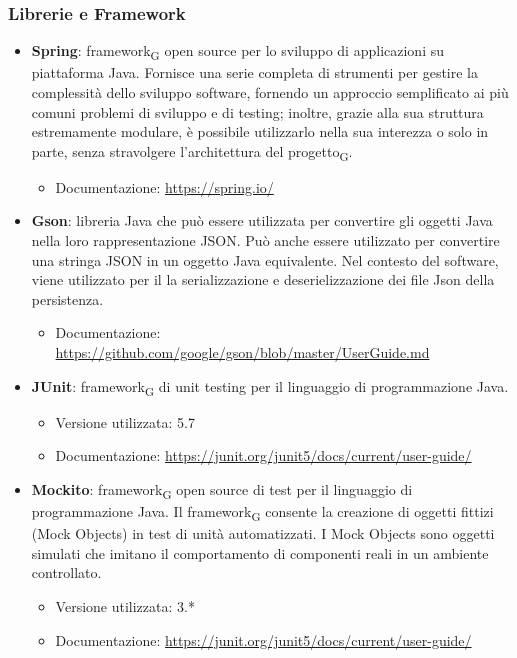 \subsubsection{Librerie e Framework}

\begin{itemize}
	\item \textbf{Spring}: framework\textsubscript{G} open source per lo sviluppo di applicazioni su piattaforma Java. Fornisce una serie completa di strumenti per gestire la complessità dello sviluppo software, fornendo un approccio semplificato ai più comuni problemi di sviluppo e di testing; inoltre, grazie alla sua struttura estremamente modulare, è possibile utilizzarlo nella sua interezza o solo in parte, senza stravolgere l’architettura del progetto\textsubscript{G}.
	\begin{itemize}
		\item Documentazione: \url{https://spring.io/}
	\end{itemize}
	\item \textbf{Gson}: libreria Java che può essere utilizzata per convertire gli oggetti Java nella loro rappresentazione JSON. Può anche essere utilizzato per convertire una stringa JSON in un oggetto Java equivalente. Nel contesto del software, viene utilizzato per il la serializzazione e deserielizzazione dei file Json della persistenza.
	\begin{itemize}
	\item Documentazione: \url{https://github.com/google/gson/blob/master/UserGuide.md}
	\end{itemize}
	\item \textbf{JUnit}: framework\textsubscript{G} di unit testing per il linguaggio di programmazione Java.
	\begin{itemize}
		\item Versione utilizzata: 5.7
		\item Documentazione: \url{https://junit.org/junit5/docs/current/user-guide/}
	\end{itemize}

	\item \textbf{Mockito}: framework\textsubscript{G} open source di test per il linguaggio di programmazione Java. Il framework\textsubscript{G} consente la creazione di oggetti fittizi (Mock Objects) in test di unità automatizzati. I Mock Objects sono oggetti simulati che imitano il comportamento di componenti reali in un ambiente controllato.
		\begin{itemize}
		\item Versione utilizzata: 3.*
		\item Documentazione: \url{https://junit.org/junit5/docs/current/user-guide/}
	\end{itemize}

\end{itemize}
